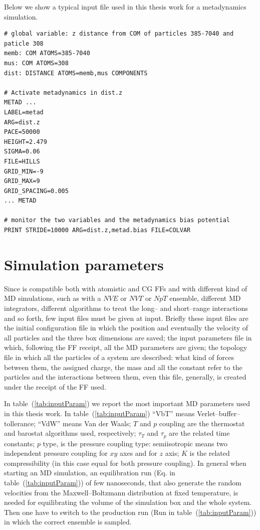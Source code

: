 Below we show a typical input file used in this thesis work for a metadynamics simulation.
\begin{Verbatim}[fontsize=\scriptsize,xleftmargin=1cm]
# global variable: z distance from COM of particles 385-7040 and paticle 308 
memb: COM ATOMS=385-7040
mus: COM ATOMS=308
dist: DISTANCE ATOMS=memb,mus COMPONENTS

# Activate metadynamics in dist.z
METAD ...
LABEL=metad
ARG=dist.z 
PACE=50000
HEIGHT=2.479
SIGMA=0.06
FILE=HILLS
GRID_MIN=-9
GRID_MAX=9
GRID_SPACING=0.005
... METAD

# monitor the two variables and the metadynamics bias potential
PRINT STRIDE=10000 ARG=dist.z,metad.bias FILE=COLVAR
\end{Verbatim}

\section{Simulation parameters}
Since \gromacs is compatible both with atomistic and \ac{CG} \acp{FF} and with different kind of \ac{MD} simulations, such as with a $NVE$ or $NVT$ or $NpT$ ensemble, different \ac{MD} integrators, different algorithms to treat the long-- and short--range interactions and so forth, few input files must be given at \gromacs input. Briefly these input files are the initial configuration file in which the position and eventually the velocity of all particles and the three box dimensions are saved; the input parameters file in which, following the \ac{FF} receipt, all the \ac{MD} parameters are given; the topology file in which all the particles of a system are described: what kind of forces between them, the assigned charge, the mass and all the constant refer to the particles and the interactions between them, even this file, generally, is created under the receipt of the \ac{FF} used.

In table~(\ref{tab:inputParam}) we report the most important \ac{MD} parameters used in this thesis work. In table~(\ref{tab:inputParam}) ``VbT'' means Verlet--buffer--tollerance; ``VdW'' means Van der Waals; $T$ and $p$ coupling are the thermostat and barostat algorithms used, respectively; $\tau_T$ and $\tau_p$ are the related time constants; $p$ type, is the pressure coupling type: semiisotropic means two independent pressure coupling for $xy$ axes and for $z$ axis; $K$ is the related compressibility (in this case equal for both pressure coupling). In general when starting an \ac{MD} simulation, an equilibration run (Eq. in table~(\ref{tab:inputParam})) of few nanoseconds, that also generate the random velocities from the Maxwell–Boltzmann distribution at fixed temperature, is needed for equilibrating the volume of the simulation box and the whole system. Then one have to switch to the production run (Run in table~(\ref{tab:inputParam})) in which the correct ensemble is sampled. 

